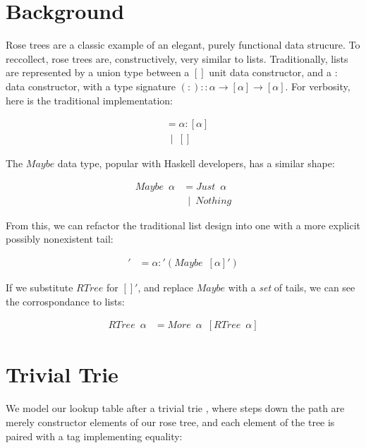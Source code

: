 \documentclass[twoside]{article}
\begin{document}
\begin{multicols}{2} %

\section*{Background}

Rose trees \cite{heller} are a classic example of an elegant, purely functional data strucure.
To reccollect, rose trees are, constructively, very similar to lists. Traditionally,
lists are represented by a union type between a \([]\) unit data constructor, and
a \(:\) data constructor, with a type signature
\((:) :: \alpha \rightarrow [\alpha] \rightarrow [\alpha]\). For verbosity, here
is the traditional implementation:

\begin{align*}
[\alpha] &= \alpha : [\alpha]\\
         & \enspace | \enspace []
\end{align*}

The \(Maybe\) data type, popular with Haskell \cite{haskell10} developers, has a similar shape:

\begin{align*}
Maybe \enspace \alpha &= Just \enspace \alpha\\
                      & \enspace | \enspace Nothing
\end{align*}

From this, we can refactor the traditional list design into one with a
more explicit possibly nonexistent tail:

\begin{align*}
[\alpha]' &= \alpha :' (Maybe \enspace [\alpha]')
\end{align*}

If we substitute \(RTree\) for \([]'\), and replace \(Maybe\) with a \textit{set}
of tails, we can see the corrospondance to lists:

\begin{align*}
RTree \enspace \alpha &= More \enspace \alpha \enspace [RTree \enspace \alpha]
\end{align*}



\section*{Trivial Trie}

We model our lookup table after a trivial trie \cite{trie}, where steps down the path are
merely constructor elements of our rose tree, and each element of the tree is
paired with a tag implementing equality:


\end{multicols}
\end{document}
